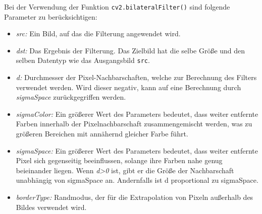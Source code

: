 Bei der Verwendung der Funktion \verb|cv2.bilateralFilter()| sind folgende Parameter zu berücksichtigen:
\begin{itemize}
    \item \textit{src: } Ein Bild, auf das die Filterung angewendet wird.
    \item \textit{dst: } Das Ergebnis der Filterung. Das Zielbild hat die selbe Größe und den selben Datentyp wie das Ausgangsbild \verb|src|.
    \item \textit{d: }Durchmesser der Pixel-Nachbarschaften, welche zur Berechnung des Filters verwendet werden. Wird dieser negativ, kann auf eine Berechnung durch \textit{sigmaSpace} zurückgegriffen werden.
    \item \textit{sigmaColor: } Ein größerer Wert des Parameters bedeutet, dass weiter entfernte Farben innerhalb der Pixelnachbarschaft zusammengemischt werden, was zu größeren Bereichen mit annähernd gleicher Farbe führt.
    \item \textit{sigmaSpace: }Ein größerer Wert des Parameters bedeutet, dass weiter entfernte Pixel sich gegenseitig beeinflussen, solange ihre Farben nahe genug beieinander liegen. Wenn \textit{d>0} ist, gibt er die Größe der Nachbarschaft unabhängig von sigmaSpace an. Andernfalls ist d proportional zu sigmaSpace.
    \item \textit{borderType: }Randmodus, der für die Extrapolation von Pixeln außerhalb des Bildes verwendet wird.
\end{itemize}
\cite{Filter}

